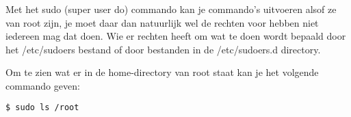 Met het sudo (super user do) commando kan je commando's uitvoeren alsof ze van root zijn, je moet daar dan natuurlijk wel de rechten voor hebben niet iedereen mag dat doen. Wie er rechten heeft om wat te doen wordt bepaald door het /etc/sudoers bestand of door bestanden in de /etc/sudoers.d directory.

Om te zien wat er in de home-directory van root staat kan je het volgende commando geven:
\begin{lstlisting}[language=bash]
$ sudo ls /root
\end{lstlisting}
